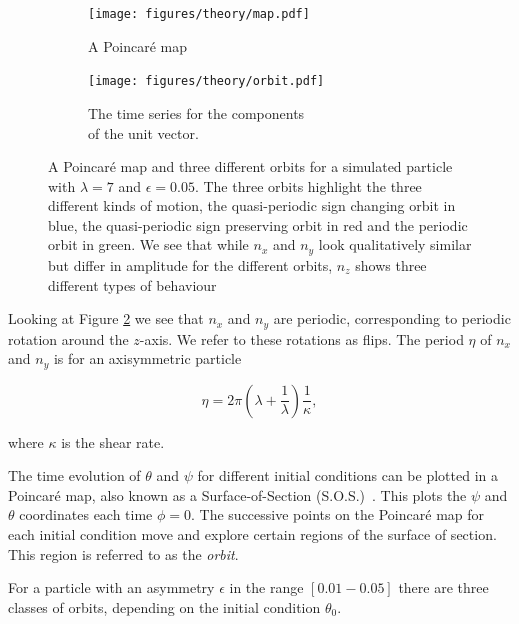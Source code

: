 \begin{figure}[H]
\centering
\begin{subfigure}[b]{0.45\textwidth}
\texttt{[image: figures/theory/map.pdf]}
\caption{A Poincaré map}\label{fig:orbitmap}
\end{subfigure}\hspace{1em}%
\begin{subfigure}[b]{0.5\textwidth}
\texttt{[image: figures/theory/orbit.pdf]}
\caption{The time series for the components \\ of the unit vector.}\label{fig:orbitparams}
\end{subfigure}
\caption{A Poincaré map and three different orbits for a simulated particle with $\lambda=7$ and $\epsilon=0.05$. The three orbits highlight the three different kinds of motion, the quasi-periodic sign changing orbit in blue, the quasi-periodic sign preserving orbit in red and the periodic orbit in green. We see that while $n_x$ and $n_y$ look qualitatively similar but differ in amplitude for the different orbits, $n_z$ shows three different types of behaviour}
\label{fig:orbittypes}
\end{figure}



Looking at Figure \ref{fig:orbitparams} we see that $n_x$ and $n_y$ are periodic, corresponding to periodic rotation around the $z$-axis. We refer to these rotations as flips. The period $\eta$ of $n_x$ and $n_y$ is for an axisymmetric particle \cite{Jeffery}

\begin{equation}\label{eq:flipRate}
\eta = 2\pi \left( \lambda + \frac{1}{\lambda} \right)\frac{1}{\kappa},
\end{equation}

\noindent where $\kappa$ is the shear rate. 

The time evolution of $\theta$ and $\psi$ for different initial conditions can be plotted in a Poincaré map, also known as a Surface-of-Section (S.O.S.)~\cite{poincare}. This plots the $\psi$ and $\theta$ coordinates each time $\phi = 0$. The successive points on the Poincaré map for each initial condition move and explore certain regions of the surface of section. This region is referred to as the \emph{orbit}. 

For a particle with an asymmetry $\epsilon$ in the range $\left[0.01-0.05\right]$ there are three classes of orbits, depending on the initial condition $\theta_0$.

